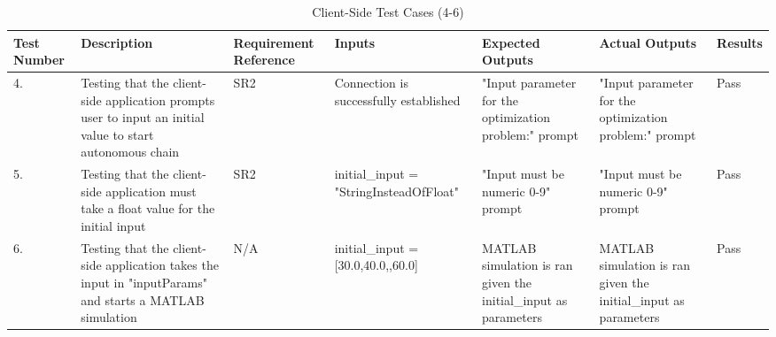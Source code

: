 \documentclass[12pt, titlepage]{article}
\begin{document}
\begin{center}
    \begin{table}[H]
        \centering
        \begin{tabular}{|p{1cm}|p{2.2cm}|p{2.5cm}|p{2.7cm}|p{2.4cm}|p{2.4cm}|p{1.3cm}|}
        \hline
        \bf Test Number & \bf Description & \bf Requirement Reference & \bf Inputs & \bf Expected Outputs & \bf Actual Outputs & \bf Results \\
        \hline
        4. & Testing that the client-side application prompts user to input an initial value to start autonomous chain & SR2 & Connection is successfully established & "Input parameter for the optimization problem:" prompt & "Input parameter for the optimization problem:" prompt & Pass\\
        \hline
        5. & Testing that the client-side application must take a float value for the initial input & SR2 & initial\_input = "StringInsteadOfFloat" & "Input must be numeric 0-9" prompt & "Input must be numeric 0-9" prompt & Pass\\
        \hline
        6. & Testing that the client-side application takes the input in "inputParams" and starts a MATLAB simulation & N/A & initial\_input = [30.0,40.0,\newline50.0,60.0] & MATLAB simulation is ran given the initial\_input as parameters & MATLAB simulation is ran given the initial\_input as parameters & Pass\\
        \hline
        \end{tabular}
        \caption{Client-Side Test Cases (4-6)}
        \label{tab:my_label8}
    \end{table}
\end{center}
\end{document}
